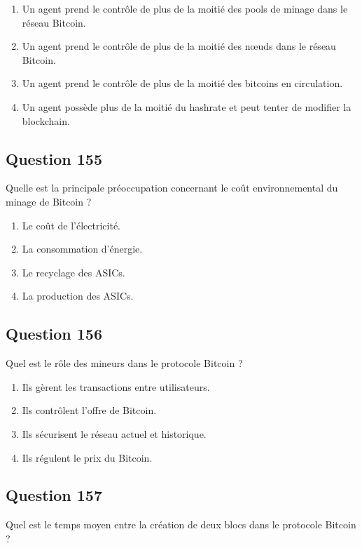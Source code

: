 \documentclass[12pt,a4paper]{article}
\begin{document}
\begin{enumerate}[label=\Alph*., leftmargin=*]
\item Un agent prend le contrôle de plus de la moitié des pools de minage dans le réseau Bitcoin.
\item Un agent prend le contrôle de plus de la moitié des nœuds dans le réseau Bitcoin.
\item Un agent prend le contrôle de plus de la moitié des bitcoins en circulation.
\item Un agent possède plus de la moitié du hashrate et peut tenter de modifier la blockchain.
\end{enumerate}

\bigskip


\subsection*{Question 155}
Quelle est la principale préoccupation concernant le coût environnemental du minage de Bitcoin ?

\begin{enumerate}[label=\Alph*., leftmargin=*]
\item Le coût de l'électricité.
\item La consommation d'énergie.
\item Le recyclage des ASICs.
\item La production des ASICs.
\end{enumerate}

\bigskip


\subsection*{Question 156}
Quel est le rôle des mineurs dans le protocole Bitcoin ?

\begin{enumerate}[label=\Alph*., leftmargin=*]
\item Ils gèrent les transactions entre utilisateurs.
\item Ils contrôlent l'offre de Bitcoin.
\item Ils sécurisent le réseau actuel et historique.
\item Ils régulent le prix du Bitcoin.
\end{enumerate}

\bigskip


\subsection*{Question 157}
Quel est le temps moyen entre la création de deux blocs dans le protocole Bitcoin ?
\end{document}
